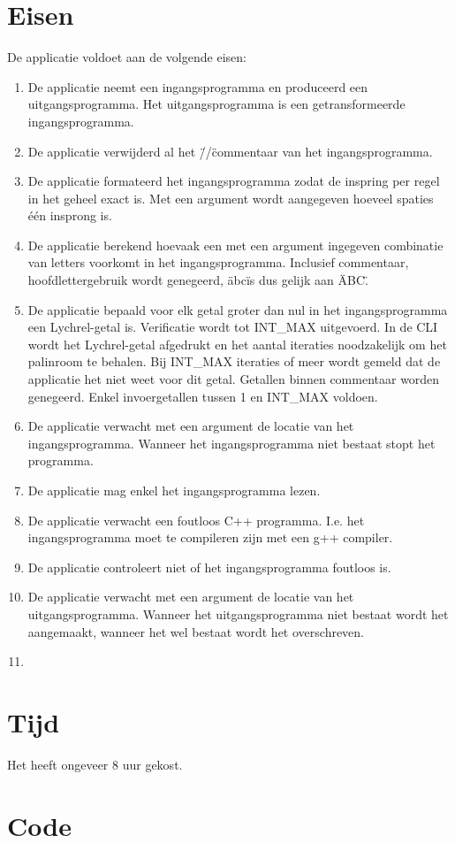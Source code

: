 \documentclass[10pt]{article}
\begin{document}
\section{Eisen}
De applicatie voldoet aan de volgende eisen:
\begin{enumerate}
    \item De applicatie neemt een ingangsprogramma en produceerd een uitgangsprogramma. Het uitgangsprogramma is een
          getransformeerde ingangsprogramma.
    \item De applicatie verwijderd al het \"//\" commentaar van het ingangsprogramma.
    \item De applicatie formateerd het ingangsprogramma zodat de inspring per regel in het geheel exact is. Met een
          argument wordt aangegeven hoeveel spaties \'e\'en insprong is.
    \item De applicatie berekend hoevaak een met een argument ingegeven combinatie van letters voorkomt in het
          ingangsprogramma. Inclusief commentaar, hoofdlettergebruik wordt genegeerd, \"abc\" is dus gelijk aan
          \"ABC\".
    \item De applicatie bepaald voor elk getal groter dan nul in het ingangsprogramma een Lychrel-getal is. Verificatie
          wordt tot INT\_MAX uitgevoerd. In de CLI wordt het Lychrel-getal afgedrukt en het aantal iteraties
          noodzakelijk om het
          palinroom te behalen. Bij INT\_MAX iteraties of meer wordt gemeld dat de applicatie het niet weet voor dit
          getal. Getallen binnen commentaar worden genegeerd. Enkel invoergetallen tussen 1 en INT\_MAX voldoen.
    \item De applicatie verwacht met een argument de locatie van het ingangsprogramma. Wanneer het ingangsprogramma
          niet bestaat stopt het programma.
    \item De applicatie mag enkel het ingangsprogramma lezen.
    \item De applicatie verwacht een foutloos C++ programma. I.e. het ingangsprogramma moet te compileren zijn met een
          g++ compiler.
    \item De applicatie controleert niet of het ingangsprogramma foutloos is.
    \item De applicatie verwacht met een argument de locatie van het uitgangsprogramma. Wanneer het uitgangsprogramma
          niet bestaat wordt het aangemaakt, wanneer het wel bestaat wordt het overschreven.
    \item
\end{enumerate}

\section{Tijd}
Het heeft ongeveer 8 uur gekost.

\section{Code}\label{sec:code}

\end{document}
